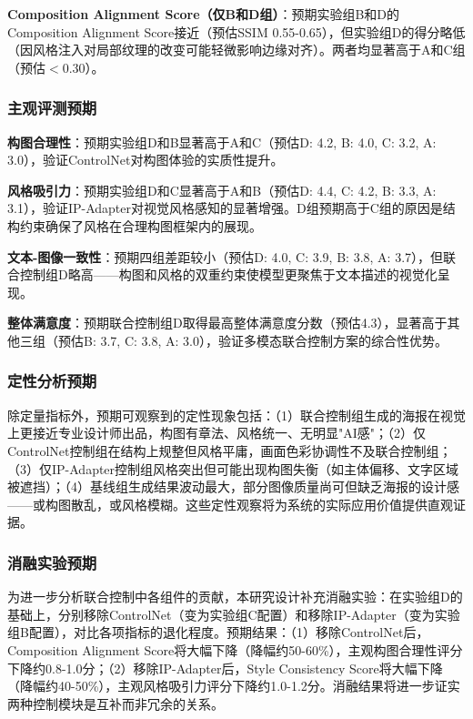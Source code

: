 \documentclass[12pt,a4paper]{ctexart}
\newcommand{\controlnet}{ControlNet}
\newcommand{\ipadapter}{IP-Adapter}
\begin{document}
\textbf{Composition Alignment Score（仅B和D组）}：预期实验组B和D的Composition Alignment Score接近（预估SSIM 0.55-0.65），但实验组D的得分略低（因风格注入对局部纹理的改变可能轻微影响边缘对齐）。两者均显著高于A和C组（预估$<$0.30）。

\subsubsection{主观评测预期}

\textbf{构图合理性}：预期实验组D和B显著高于A和C（预估D: 4.2, B: 4.0, C: 3.2, A: 3.0），验证\controlnet{}对构图体验的实质性提升。

\textbf{风格吸引力}：预期实验组D和C显著高于A和B（预估D: 4.4, C: 4.2, B: 3.3, A: 3.1），验证\ipadapter{}对视觉风格感知的显著增强。D组预期高于C组的原因是结构约束确保了风格在合理构图框架内的展现。

\textbf{文本-图像一致性}：预期四组差距较小（预估D: 4.0, C: 3.9, B: 3.8, A: 3.7），但联合控制组D略高——构图和风格的双重约束使模型更聚焦于文本描述的视觉化呈现。

\textbf{整体满意度}：预期联合控制组D取得最高整体满意度分数（预估4.3），显著高于其他三组（预估B: 3.7, C: 3.8, A: 3.0），验证多模态联合控制方案的综合性优势。

\subsubsection{定性分析预期}

除定量指标外，预期可观察到的定性现象包括：（1）联合控制组生成的海报在视觉上更接近专业设计师出品，构图有章法、风格统一、无明显"AI感"；（2）仅\controlnet{}控制组在结构上规整但风格平庸，画面色彩协调性不及联合控制组；（3）仅\ipadapter{}控制组风格突出但可能出现构图失衡（如主体偏移、文字区域被遮挡）；（4）基线组生成结果波动最大，部分图像质量尚可但缺乏海报的设计感——或构图散乱，或风格模糊。这些定性观察将为系统的实际应用价值提供直观证据。

\subsubsection{消融实验预期}

为进一步分析联合控制中各组件的贡献，本研究设计补充消融实验：在实验组D的基础上，分别移除\controlnet{}（变为实验组C配置）和移除\ipadapter{}（变为实验组B配置），对比各项指标的退化程度。预期结果：（1）移除\controlnet{}后，Composition Alignment Score将大幅下降（降幅约50-60\%），主观构图合理性评分下降约0.8-1.0分；（2）移除\ipadapter{}后，Style Consistency Score将大幅下降（降幅约40-50\%），主观风格吸引力评分下降约1.0-1.2分。消融结果将进一步证实两种控制模块是互补而非冗余的关系。
\end{document}
